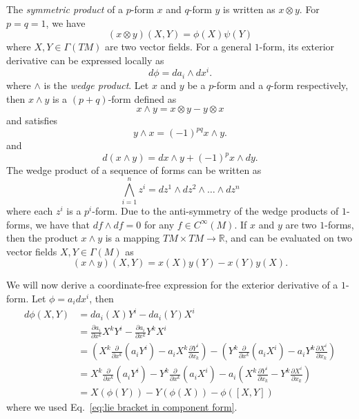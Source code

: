 The \textit{symmetric product} of a $p$-form $x$ and $q$-form $y$ is written as $x \otimes y$. For $p=q=1$, we have
\begin{equation}
(x \otimes y)(X, Y) = \phi(X) \psi(Y)
\end{equation} 
where $X, Y \in \Gamma(TM)$ are two vector fields. For a general $1$-form, its exterior derivative can be expressed locally as
\begin{equation} \label{eq:exterior derivative of 1-form}
d\phi = d a_i \wedge dx^i.
\end{equation}
where $\wedge$ is the \textit{wedge product}. Let $x$ and $y$ be a $p$-form
and a $q$-form respectively, then $x \wedge y$ is a $(p+q)$-form defined as
\begin{equation}
x \wedge y = x \otimes y - y \otimes x
\end{equation}
and satisfies
\begin{equation}
y\wedge x=(-1)^{pq}x\wedge y.
\end{equation}
and
\begin{equation} \label{eq:exterior derivative of wedge product}
d(x \wedge y) = dx \wedge y + (-1)^p x \wedge d y.
\end{equation}
The wedge product of a sequence of forms can be written as
\begin{equation}
\bigwedge_{i=1}^n z^i = dz^1 \wedge dz^2 \wedge \dots \wedge dz^n
\end{equation}
where each $z^i$ is a $p^i$-form. Due to the anti-symmetry of the wedge products of $1$-forms, we have
that $df \wedge df = 0$ for any $f \in C^\infty(M)$. If $x$ and $y$ are two $1$-forms, then the product $x \wedge y$ is a mapping $TM \times TM \to \mathbb{R}$, and can be evaluated on two vector fields $X,Y \in \Gamma(M)$ as
\begin{equation}
(x \wedge y)(X, Y) = x(X) y(Y) - x(Y) y(X).
\end{equation}

We will now derive a coordinate-free expression for the exterior derivative of a $1$-form. Let $\phi = a_i dx^i$, then
\begin{equation} \label{eq:exterior derivative of 1-form evaluated}
\begin{aligned}
d\phi(X,Y) & = da_i(X) Y^i - da_i(Y) X^i \\
 & = \frac{\partial a_i}{\partial x^k} X^k Y^i - \frac{\partial a_i}{\partial x^k} Y^k X^i \\
 & =  \left( X^k \frac{\partial}{\partial x^k} ( a_i Y^i) - a_i X^k \frac{\partial Y^i}{\partial x_k} \right) -  \left( Y^k \frac{\partial}{\partial x^k} ( a_i X^i) - a_i Y^k \frac{\partial X^i}{\partial x_k} \right) \\
 & = X^k \frac{\partial}{\partial x^k} ( a_i Y^i) - Y^k \frac{\partial}{\partial x^k} ( a_i X^i) - a_i  \left( X^k \frac{\partial Y^i}{\partial x_k} - Y^k \frac{\partial X^i}{\partial x_k} \right) \\
 & = X(\phi(Y)) - Y(\phi(X)) - \phi([X,Y])
\end{aligned}
\end{equation}
where we used Eq.~\ref{eq:lie bracket in component form}.

